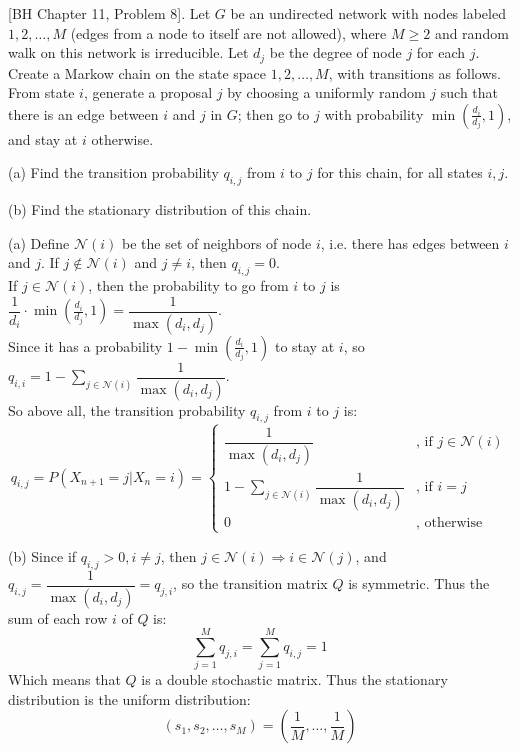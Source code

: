 \begin{homeworkProblem}

[BH Chapter 11, Problem 8]. Let $G$ be an undirected network with nodes labeled $1,2, \ldots, M$ (edges from a node to itself are not allowed), where $M \geq 2$ and random walk on this network is irreducible. Let $d_j$ be the degree of node $j$ for each $j$. Create a Markow chain on the state space $1,2, \ldots, M$, with transitions as follows. From state $i$, generate a proposal $j$ by choosing a uniformly random $j$ such that there is an edge between $i$ and $j$ in $G$; then go to $j$ with probability $\min \left(\frac{d_i}{d_j}, 1\right)$, and stay at $i$ otherwise.

(a) Find the transition probability $q_{i,j}$ from $i$ to $j$ for this chain, for all states $i, j$.

(b) Find the stationary distribution of this chain.

\solution

(a) Define $\mathcal{N}(i)$ be the set of neighbors of node $i$, i.e. there has edges between $i$ and $j$. If $j\not\in \mathcal{N}(i)$ and $j\neq i$, then $q_{i,j}=0$. \\
If $j\in \mathcal{N}(i)$, then the probability to go from $i$ to $j$ is $\dfrac{1}{d_i}\cdot\min\left(\frac{d_i}{d_j},1\right)=\dfrac{1}{\max(d_i,d_j)}$. \\
Since it has a probability $1-\min\left(\frac{d_i}{d_j},1\right)$ to stay at $i$, so $q_{i,i}=1-\sum\limits_{j\in\mathcal{N}(i)}\dfrac{1}{\max(d_i,d_j)}$. \\
So above all, the transition probability $q_{i,j}$ from $i$ to $j$ is:
$$ q_{i,j} = P(X_{n+1}=j|X_n=i) = \begin{cases}
\dfrac{1}{\max(d_i,d_j)} & \text{, if } j\in\mathcal{N}(i) \\
1 - \sum\limits_{j\in\mathcal{N}(i)}\dfrac{1}{\max(d_i,d_j)} & \text{, if } i=j \\
0 & \text{, otherwise}
\end{cases}$$

(b) Since if $q_{i,j}>0,i\neq j$, then $j\in\mathcal{N}(i) \Rightarrow i\in\mathcal{N}(j)$, and $q_{i,j}=\dfrac{1}{\max(d_i,d_j)}=q_{j,i}$, so the transition matrix $Q$ is symmetric. Thus the sum of each row $i$ of $Q$ is:
$$\sum_{j=1}^M q_{j,i} = \sum_{j=1}^M q_{i,j} = 1$$
Which means that $Q$ is a double stochastic matrix. Thus the stationary distribution is the uniform distribution:
$$(s_1,s_2,\ldots,s_M) = \left(\dfrac{1}{M},\ldots,\dfrac{1}{M}\right)$$

\end{homeworkProblem}

\newpage